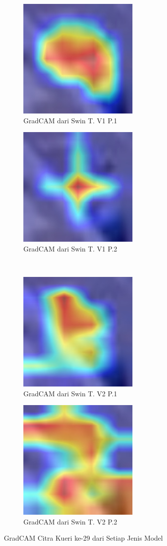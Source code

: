 \begin{figure}[h!]
  \centering
  \begin{subfigure}{.4\textwidth}
    \centering
    \includegraphics[width=.3\linewidth]{gambar/Que29_gradCAMV1P1IT3.jpg}
    \caption{GradCAM dari Swin T. V1 P.1}
    \label{gradcamkuerinomorduasembilanV1P1}
  \end{subfigure}%
  \begin{subfigure}{.4\textwidth}
    \centering
    \includegraphics[width=.3\linewidth]{gambar/Que29_gradCAMV1P2IT2.jpg}
    \caption{GradCAM dari Swin T. V1 P.2}
    \label{gradcamkuerinomorduasembilanV1P2}
  \end{subfigure}%
  \\
  \begin{subfigure}{.4\textwidth}
    \centering
    \includegraphics[width=.3\linewidth]{gambar/Que29_V2P1IT1.png}
    \caption{GradCAM dari Swin T. V2 P.1}
    \label{gradcamkuerinomorduasembilanV2P1}
  \end{subfigure}%
  \begin{subfigure}{.4\textwidth}
    \centering
    \includegraphics[width=.3\linewidth]{gambar/Que29_V2P2IT3.png}
    \caption{GradCAM dari Swin T. V2 P.2}
    \label{gradcamkuerinomorduasembilanV2P2}
  \end{subfigure}%
  \caption{GradCAM Citra Kueri ke-29 dari Setiap Jenis Model}
  \label{fig:gradcamdarisetiapjenismodelpengujiankeenam}
\end{figure}

